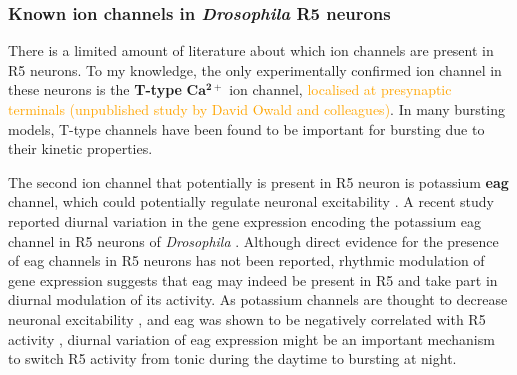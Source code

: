 \documentclass[../main.tex]{subfiles}
\begin{document}



\subsubsection{Known ion channels in \textit{Drosophila} R5 neurons} \label{subsubsect:known_channels_in_r5}
There is a limited amount of literature about which ion channels are present in R5 neurons. To my knowledge, the only experimentally confirmed ion channel in these neurons is the \textbf{T-type} \( \mathbf{Ca^{2+}} \) ion channel, \textcolor{orange}{localised at presynaptic terminals (unpublished study by David Owald and colleagues)}. In many bursting models, T-type channels have been found to be important for bursting due to their kinetic properties.

The second ion channel that potentially is present in R5 neuron is potassium \textbf{\gls{eag}} channel, which could potentially regulate neuronal excitability \parencite{bruggemannEtheragogoEncodesVoltagegated1993}. A recent study reported diurnal variation in the gene expression encoding the potassium \gls{eag} channel in R5 neurons of \textit{Drosophila} \parencite{doppSinglecellTranscriptomicsReveals2024}. Although direct evidence for the presence of \gls{eag} channels in R5 neurons has not been reported, rhythmic modulation of gene expression suggests that \gls{eag} may indeed be present in R5 and take part in diurnal modulation of its activity.
As potassium channels are thought to decrease neuronal excitability \parencite{bruggemannEtheragogoEncodesVoltagegated1993}, and \gls{eag} was shown to be negatively correlated with R5 activity \parencite{doppSinglecellTranscriptomicsReveals2024}, diurnal variation of \gls{eag} expression might be an important mechanism to switch R5 activity from tonic during the daytime to bursting at night.
\end{document}
